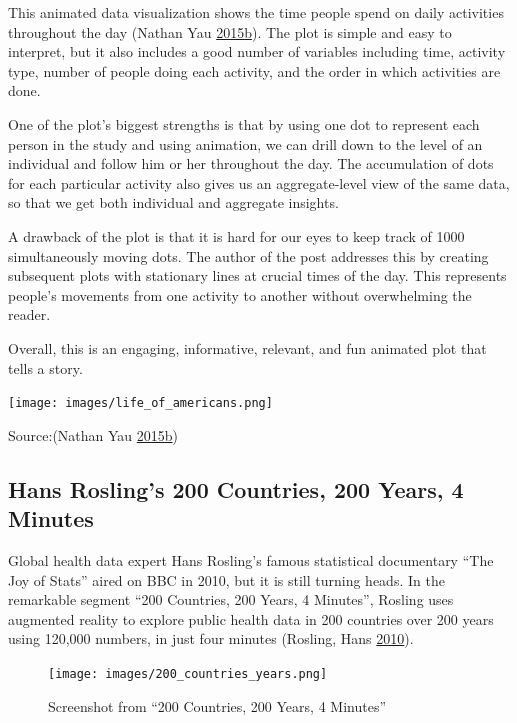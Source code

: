 \documentclass[]{book}
\begin{document}
This animated data visualization shows the time people spend on daily activities throughout the day (Nathan Yau \protect\hyperlink{ref-American_life}{2015}\protect\hyperlink{ref-American_life}{b}). The plot is simple and easy to interpret, but it also includes a good number of variables including time, activity type, number of people doing each activity, and the order in which activities are done.

One of the plot's biggest strengths is that by using one dot to represent each person in the study and using animation, we can drill down to the level of an individual and follow him or her throughout the day. The accumulation of dots for each particular activity also gives us an aggregate-level view of the same data, so that we get both individual and aggregate insights.

A drawback of the plot is that it is hard for our eyes to keep track of 1000 simultaneously moving dots. The author of the post addresses this by creating subsequent plots with stationary lines at crucial times of the day. This represents people's movements from one activity to another without overwhelming the reader.

Overall, this is an engaging, informative, relevant, and fun animated plot that tells a story.

\texttt{[image: images/life\_of\_americans.png]}

Source:(Nathan Yau \protect\hyperlink{ref-American_life}{2015}\protect\hyperlink{ref-American_life}{b})

\hypertarget{hans-roslings-200-countries-200-years-4-minutes}{%
\subsection{Hans Rosling's 200 Countries, 200 Years, 4 Minutes}\label{hans-roslings-200-countries-200-years-4-minutes}}

Global health data expert Hans Rosling's famous statistical documentary ``The Joy of Stats'' aired on BBC in 2010, but it is still turning heads. In the remarkable segment ``200 Countries, 200 Years, 4 Minutes'', Rosling uses augmented reality to explore public health data in 200 countries over 200 years using 120,000 numbers, in just four minutes (Rosling, Hans \protect\hyperlink{ref-hans_rosling}{2010}).

\begin{figure}
\centering
\texttt{[image: images/200\_countries\_years.png]}
\caption{Screenshot from ``200 Countries, 200 Years, 4 Minutes''}
\end{figure}
\end{document}
